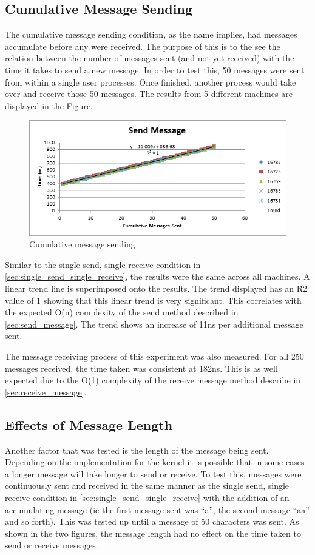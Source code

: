 \documentclass[12pt,twocolumn]{report}
\begin{document}
\subsection{Cumulative Message Sending}
\label{sec:cumulative_message_sending}

The cumulative message sending condition, as the name implies, had messages accumulate before any were received. The purpose of this is to the see the relation between the number of messages sent (and not yet received) with the time it takes to send a new message. In order to test this, 50 messages were sent from within a single user processes. Once finished, another process would take over and receive those 50 messages. The results from 5 different machines are displayed in the Figure.
\begin{figure}[h!]
  \centering
    \includegraphics{SendMessage.png}
  \caption{Cumulative message sending}
\end{figure}

Similar to the single send, single receive condition in \ref{sec:single_send_single_receive}, the results were the same across all machines. A linear trend line is superimposed onto the results. The trend displayed has an R2 value of 1 showing that this linear trend is very significant. This correlates with the expected O(n) complexity of the send method described in \ref{sec:send_message}. The trend shows an increase of 11ns per additional message sent.

The message receiving process of this experiment was also measured. For all 250 messages received, the time taken was consistent at 182ns. This is as well expected due to the O(1) complexity of the receive message method describe in \ref{sec:receive_message}.

\subsection{Effects of Message Length}
\label{sec:message_length}
Another factor that was tested is the length of the message being sent. Depending on the implementation for the kernel it is possible that in some cases a longer message will take longer to send or receive. To test this, messages were continuously sent and received in the same manner as the single send, single receive condition in \ref{sec:single_send_single_receive} with the addition of an accumulating message (ie the first message sent was “a”, the second message “aa” and so forth).  This was tested up until a message of 50 characters was sent. As shown in the two figures, the message length had no effect on the time taken to send or receive messages.
\end{document}

